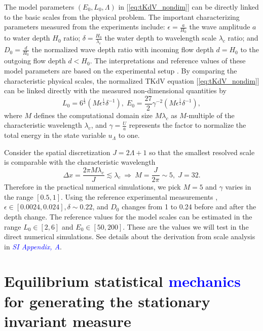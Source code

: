 \documentclass[9pt,twocolumn,twoside,lineno]{pnas-new}
\begin{document}
The model parameters $\left(E_{0},L_{0},\Lambda\right)$ in [\ref{eq:tKdV_nondim}]
can be directly linked to the basic scales from the physical problem.
The important characterizing parameters measured from the experiments
include: $\epsilon=\frac{a}{H_{0}}$ the wave amplitude $a$ to water
depth $H_{0}$ ratio; $\delta=\frac{H_{0}}{\lambda_{c}}$ the water
depth to wavelength scale $\lambda_{c}$ ratio; and $D_{0}=\frac{d}{H_{0}}$
the normalized wave depth ratio with incoming flow depth $d=H_{0}$
to the outgoing flow depth $d<H_{0}$. The interpretations and reference
values of these model parameters are based on the experimental setup
\cite{bolles2018anomalous}. By comparing the characteristic physical
scales, the normalized TKdV equation [\ref{eq:tKdV_nondim}] can be
linked directly with the measured non-dimensional quantities by
\begin{equation}
L_{0}=6^{\frac{1}{3}}\left(M\epsilon^{\frac{1}{2}}\delta^{-1}\right),\;E_{0}=\frac{27}{2}\gamma^{-2}\left(M\epsilon^{\frac{1}{2}}\delta^{-1}\right),\label{eq:params}
\end{equation}
where $M$ defines the computational domain size $M\lambda_{c}$
as $M$-multiple of the characteristic wavelength $\lambda_{c}$,
and $\gamma=\frac{U}{a}$ represents the factor to normalize the total
energy in the state variable $u_{\Lambda}$ to one. 


Consider the spatial discretization $J=2\Lambda+1$ so that the smallest
resolved scale is comparable with the characteristic wavelength
\[
\Delta x=\frac{2\pi M\lambda_{c}}{J}\lesssim\lambda_{c}\:\Rightarrow\:M=\frac{J}{2\pi}\sim5,\;J=32.
\]
Therefore in the practical numerical simulations, we pick $M=5$ and
$\gamma$ varies in the range $\left[0.5,1\right]$. Using the reference
experimental measurements \cite{bolles2018anomalous}, $\epsilon\in\left[0.0024,0.024\right],\delta\sim0.22$,
and $D_{0}$ changes from 1 to 0.24 before and after the depth change.
The reference values for the model scales can be estimated in the
range $L_{0}\in\left[2,6\right]$ and $E_{0}\in\left[50,200\right]$.
These are the values we will test in the direct numerical simulations.
See details about the derivation from scale analysis in \textcolor{blue}{\emph{SI Appendix, A}}.

\section{Equilibrium statistical \textcolor{blue}{mechanics} for generating the stationary invariant measure}
\end{document}
